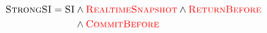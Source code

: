 \begin{frame}{}

  \begin{align*}
	\textsc{StrongSI} = \textsc{SI} &\land \textcolor{red}{\textsc{RealtimeSnapshot}} \land \textcolor{red}{\textsc{ReturnBefore}} \\
					&\land \textcolor{red}{\textsc{CommitBefore}}
  \end{align*}
\end{frame}
